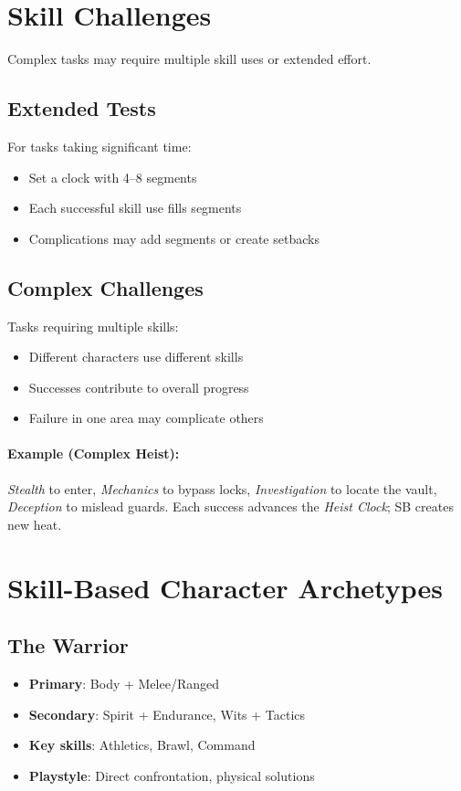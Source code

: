 \section{Skill Challenges}

Complex tasks may require multiple skill uses or extended effort.

\subsection*{Extended Tests}
For tasks taking significant time:
\begin{itemize}
\item Set a clock with 4--8 segments
\item Each successful skill use fills segments
\item Complications may add segments or create setbacks
\end{itemize}

\subsection*{Complex Challenges}
Tasks requiring multiple skills:
\begin{itemize}
\item Different characters use different skills
\item Successes contribute to overall progress
\item Failure in one area may complicate others
\end{itemize}

\paragraph{Example (Complex Heist):}
\emph{Stealth} to enter, \emph{Mechanics} to bypass locks, \emph{Investigation} to locate the vault, \emph{Deception} to mislead guards. Each success advances the \emph{Heist Clock}; SB creates new heat.

\section{Skill-Based Character Archetypes}

\subsection*{The Warrior}
\begin{itemize}
\item \textbf{Primary}: Body + Melee/Ranged
\item \textbf{Secondary}: Spirit + Endurance, Wits + Tactics
\item \textbf{Key skills}: Athletics, Brawl, Command
\item \textbf{Playstyle}: Direct confrontation, physical solutions
\end{itemize}

